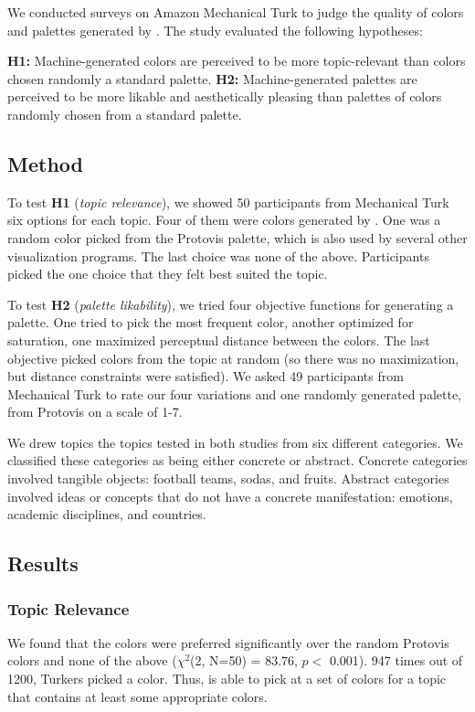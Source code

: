 We conducted surveys on Amazon Mechanical Turk to judge the quality of colors and palettes generated by \system. The study evaluated the following hypotheses:

\textbf{H1:} Machine-generated colors are perceived to be more topic-relevant than colors chosen randomly a standard palette.
\textbf{H2:} Machine-generated palettes are perceived to be more likable and aesthetically pleasing than palettes of colors randomly chosen from a standard palette. 

\subsection{Method}
To test \textbf{H1} (\textit{topic relevance}), we showed 50 participants from Mechanical Turk six options for each topic. Four of them were colors generated by \system. One was a random color picked from the Protovis palette, which is also used by several other visualization programs. The last choice was none of the above. Participants picked the one choice that they felt best suited the topic.

To test \textbf{H2} (\textit{palette likability}), we tried four objective functions for generating a palette. One tried to pick the most frequent color, another optimized for saturation, one maximized perceptual distance between the colors. The last objective picked colors from the topic at random (so there was no maximization, but distance constraints were satisfied). We asked 49 participants from Mechanical Turk to rate our four variations and one randomly generated palette, from Protovis on a scale of 1-7.

We drew topics the topics tested in both studies from six different categories. We classified these categories as being either concrete or abstract. Concrete categories involved tangible objects: football teams, sodas, and fruits. Abstract categories involved ideas or concepts that do not have a concrete manifestation: emotions, academic disciplines, and countries. 

\subsection{Results}
\subsubsection{Topic Relevance} 
We found that the \system colors were preferred significantly over the random Protovis colors and none of the above ($\chi^2$(2, N=50) = 83.76, $p <$ 0.001). 947 times out of 1200, Turkers picked a \system color.  Thus, \system is able to pick at a set of colors for a topic that contains at least some appropriate colors.

